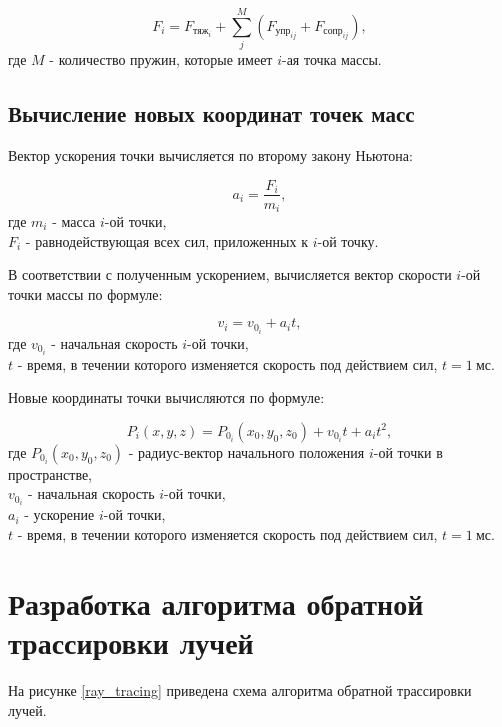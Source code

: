 \begin{equation}\label{f}
	F_i = F_{\text{тяж}_i} + \sum_{j}^{M} (F_{\text{упр}_{ij}} + F_{\text{сопр}_{ij}}),
\end{equation}
где $M$ - количество пружин, которые имеет $i$-ая точка массы.

\subsection{Вычисление новых координат точек масс}

Вектор ускорения точки вычисляется по второму закону Ньютона:

\begin{equation}\label{sln}
	a_i = \frac{F_i}{m_i},
\end{equation}
где $m_i$ - масса $i$-ой точки,\\
\text{~~~~~}$F_i$ - равнодействующая всех сил, приложенных к $i$-ой точку.

В соответствии с полученным ускорением, вычисляется вектор скорости $i$-ой точки массы по формуле:

\begin{equation}\label{velocity}
	v_i = v_{0_i} + a_i t,
\end{equation}
где $v_{0_i}$ - начальная скорость $i$-ой точки,\\
\text{~~~~~}$t$ - время, в течении которого изменяется скорость под действием сил, $t = 1~\text{мс}$.

Новые координаты точки вычисляются по формуле:

\begin{equation}\label{new_pos}
	P_i(x, y, z) = P_{0_i}(x_0, y_0, z_0) + v_{0_i} t + a_i t^2,
\end{equation}
где $P_{0_i}(x_0, y_0, z_0)$ - радиус-вектор начального положения $i$-ой точки в пространстве,\\
\text{~~~~~}$v_{0_i}$ - начальная скорость $i$-ой точки,\\
\text{~~~~~}$a_i$ - ускорение $i$-ой точки,\\
\text{~~~~~}$t$ - время, в течении которого изменяется скорость под действием сил, $t = 1~\text{мс}$.

\section{Разработка алгоритма обратной трассировки лучей}

На рисунке \ref{ray_tracing} приведена схема алгоритма обратной трассировки лучей.


